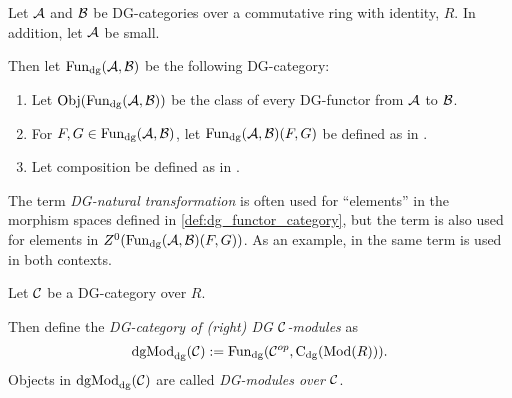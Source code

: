 \begin{definition}[\( \Fun_{\dg}(\Ac, \Bc) \)]
    \label{def:dg_functor_category}
    Let \( {\mathcal{A}} \) and \( {\mathcal{B}} \) be DG-categories over a commutative ring with identity, \( R \). In addition, let \( {\mathcal{A}} \) be small.

    Then let \( \Fun_{\dg}(\Ac, \Bc) \) be the following DG-category:
    \begin{enumerate}
        \item{
            Let \( \operatorname{Obj}(\operatorname{Fun}_{\operatorname{dg}}({\mathcal{A}}, {\mathcal{B}})) \) be the class of every DG-functor from \( {\mathcal{A}} \) to \( {\mathcal{B}} \).
        }
        \item{
            For \( F, G \in \operatorname{Fun}_{\operatorname{dg}}({\mathcal{A}}, {\mathcal{B}}) \), let \( \operatorname{Fun}_{\operatorname{dg}}({\mathcal{A}}, {\mathcal{B}})(F, G) \) be defined as in \cite[Proposition 6.3.1]{Borceux_1994}.
        }
        \item {
            Let composition be defined as in \cite[p. 295]{Borceux_1994}.
        }
    \end{enumerate}
\end{definition}

\begin{remark}
    The term \emph{DG-natural transformation} is often used for ``elements'' in the morphism spaces defined in \autoref{def:dg_functor_category}, but the term is also used for elements in \( Z^0(\operatorname{Fun}_{\operatorname{dg}}({\mathcal{A}}, {\mathcal{B}})(F, G)) \). As an example, in \cite[Definition 6.2.4, Definition 6.3.1]{Borceux_1994} the same term is used in both contexts.
\end{remark}

\begin{definition}[\( \dgMod_{\dg}(\Cc) \)]
    Let \( {\mathcal{C}} \) be a DG-category over \( R \).

    Then define the \emph{DG-category of (right) DG \( {\mathcal{C}} \)-modules} as
    \[
        \operatorname{dgMod}_{\operatorname{dg}}({\mathcal{C}}) := \operatorname{Fun}_{\operatorname{dg}}({\mathcal{C}}^{op}, \operatorname{C}_{\operatorname{dg}}(\operatorname{Mod}(R))).
    \]
    Objects in \( \dgMod_{\dg}(\Cc) \) are called \emph{DG-modules over \( {\mathcal{C}} \)}.
\end{definition}


